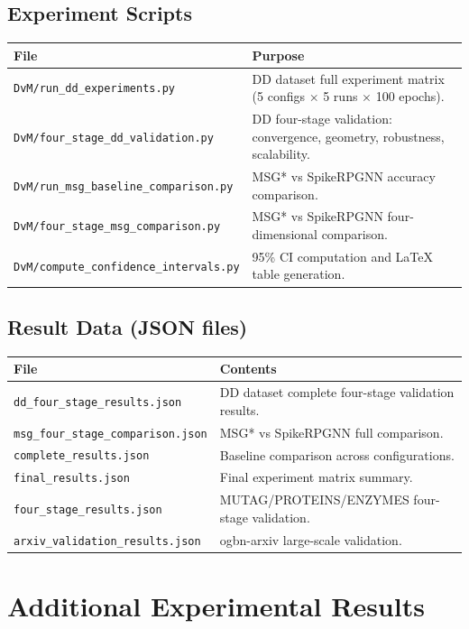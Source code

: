 \documentclass[a4paper,11pt]{article}
\begin{document}
\subsection{Experiment Scripts}
\begin{longtable}{p{6.5cm}p{8cm}}
\toprule
\textbf{File} & \textbf{Purpose} \\
\midrule
\texttt{DvM/run\_dd\_experiments.py} & DD dataset full experiment matrix (5 configs $\times$ 5 runs $\times$ 100 epochs). \\
\texttt{DvM/four\_stage\_dd\_validation.py} & DD four-stage validation: convergence, geometry, robustness, scalability. \\
\texttt{DvM/run\_msg\_baseline\_comparison.py} & MSG* vs SpikeRPGNN accuracy comparison. \\
\texttt{DvM/four\_stage\_msg\_comparison.py} & MSG* vs SpikeRPGNN four-dimensional comparison. \\
\texttt{DvM/compute\_confidence\_intervals.py} & 95\% CI computation and LaTeX table generation. \\
\bottomrule
\end{longtable}

\subsection{Result Data (JSON files)}
\begin{longtable}{p{6.5cm}p{8cm}}
\toprule
\textbf{File} & \textbf{Contents} \\
\midrule
\texttt{dd\_four\_stage\_results.json} & DD dataset complete four-stage validation results. \\
\texttt{msg\_four\_stage\_comparison.json} & MSG* vs SpikeRPGNN full comparison. \\
\texttt{complete\_results.json} & Baseline comparison across configurations. \\
\texttt{final\_results.json} & Final experiment matrix summary. \\
\texttt{four\_stage\_results.json} & MUTAG/PROTEINS/ENZYMES four-stage validation. \\
\texttt{arxiv\_validation\_results.json} & ogbn-arxiv large-scale validation. \\
\bottomrule
\end{longtable}

\section{Additional Experimental Results}
\end{document}
